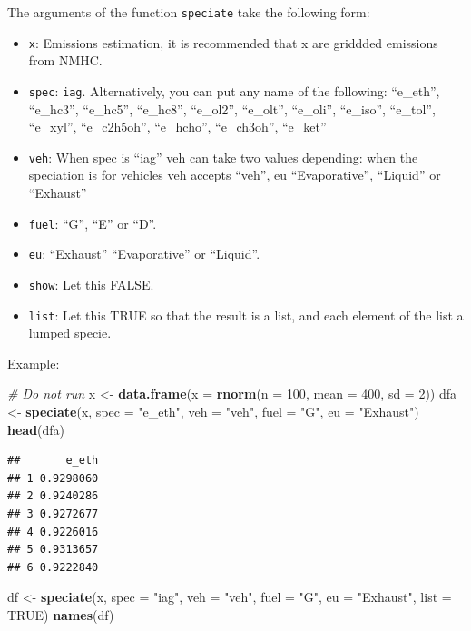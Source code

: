 \documentclass[12pt,graybox,envcountchap,sectrefs]{krantz}
\makeatletter
\newenvironment{Shaded}{\begin{snugshade}}{\end{snugshade}}
\newcommand{\KeywordTok}[1]{\textcolor[rgb]{0.13,0.29,0.53}{\textbf{#1}}}
\newcommand{\DataTypeTok}[1]{\textcolor[rgb]{0.13,0.29,0.53}{#1}}
\newcommand{\DecValTok}[1]{\textcolor[rgb]{0.00,0.00,0.81}{#1}}
\newcommand{\StringTok}[1]{\textcolor[rgb]{0.31,0.60,0.02}{#1}}
\newcommand{\CommentTok}[1]{\textcolor[rgb]{0.56,0.35,0.01}{\textit{#1}}}
\newcommand{\OtherTok}[1]{\textcolor[rgb]{0.56,0.35,0.01}{#1}}
\newcommand{\NormalTok}[1]{#1}
\providecommand{\tightlist}{%
  \setlength{\itemsep}{0pt}\setlength{\parskip}{0pt}}
\newenvironment{kframe}{%
\medskip{}
\setlength{\fboxsep}{.8em}
 \def\at@end@of@kframe{}%
 \ifinner\ifhmode%
  \def\at@end@of@kframe{\end{minipage}}%
  \begin{minipage}{\columnwidth}%
 \fi\fi%
 \def\FrameCommand##1{\hskip\@totalleftmargin \hskip-\fboxsep
 \colorbox{shadecolor}{##1}\hskip-\fboxsep
     \hskip-\linewidth \hskip-\@totalleftmargin \hskip\columnwidth}%
 \MakeFramed {\advance\hsize-\width
   \@totalleftmargin\z@ \linewidth\hsize
   \@setminipage}}%
 {\par\unskip\endMakeFramed%
 \at@end@of@kframe}
\renewenvironment{Shaded}{\begin{kframe}}{\end{kframe}}
\theoremstyle{definition}
\theoremstyle{definition}
\theoremstyle{definition}
\theoremstyle{remark}
\makeatother
\begin{document}
The arguments of the function \texttt{speciate} take the following form:

\begin{itemize}
\tightlist
\item
  \texttt{x}: Emissions estimation, it is recommended that x are
  griddded emissions from NMHC.
\item
  \texttt{spec}: \texttt{iag}. Alternatively, you can put any name of
  the following: ``e\_eth'', ``e\_hc3'', ``e\_hc5'', ``e\_hc8'',
  ``e\_ol2'', ``e\_olt'', ``e\_oli'', ``e\_iso'', ``e\_tol'',
  ``e\_xyl'', ``e\_c2h5oh'', ``e\_hcho'', ``e\_ch3oh'', ``e\_ket''
\item
  \texttt{veh}: When spec is ``iag'' veh can take two values depending:
  when the speciation is for vehicles veh accepts ``veh'', eu
  ``Evaporative'', ``Liquid'' or ``Exhaust''
\item
  \texttt{fuel}: ``G'', ``E'' or ``D''.
\item
  \texttt{eu}: ``Exhaust'' ``Evaporative'' or ``Liquid''.
\item
  \texttt{show}: Let this FALSE.
\item
  \texttt{list}: Let this TRUE so that the result is a list, and each
  element of the list a lumped specie.
\end{itemize}

Example:

\begin{Shaded}
\begin{Highlighting}[]
\CommentTok{# Do not run}
\NormalTok{x <-}\StringTok{ }\KeywordTok{data.frame}\NormalTok{(}\DataTypeTok{x =} \KeywordTok{rnorm}\NormalTok{(}\DataTypeTok{n =} \DecValTok{100}\NormalTok{, }\DataTypeTok{mean =} \DecValTok{400}\NormalTok{, }\DataTypeTok{sd =} \DecValTok{2}\NormalTok{))}
\NormalTok{dfa <-}\StringTok{ }\KeywordTok{speciate}\NormalTok{(x, }\DataTypeTok{spec =} \StringTok{"e_eth"}\NormalTok{, }\DataTypeTok{veh =} \StringTok{"veh"}\NormalTok{, }\DataTypeTok{fuel =} \StringTok{"G"}\NormalTok{, }\DataTypeTok{eu =} \StringTok{"Exhaust"}\NormalTok{)}
\KeywordTok{head}\NormalTok{(dfa)}
\end{Highlighting}
\end{Shaded}

\begin{verbatim}
##       e_eth
## 1 0.9298060
## 2 0.9240286
## 3 0.9272677
## 4 0.9226016
## 5 0.9313657
## 6 0.9222840
\end{verbatim}

\begin{Shaded}
\begin{Highlighting}[]
\NormalTok{df <-}\StringTok{ }\KeywordTok{speciate}\NormalTok{(x, }\DataTypeTok{spec =} \StringTok{"iag"}\NormalTok{, }\DataTypeTok{veh =} \StringTok{"veh"}\NormalTok{, }\DataTypeTok{fuel =} \StringTok{"G"}\NormalTok{,}
               \DataTypeTok{eu =} \StringTok{"Exhaust"}\NormalTok{, }\DataTypeTok{list =} \OtherTok{TRUE}\NormalTok{)}
\KeywordTok{names}\NormalTok{(df)}
\end{Highlighting}
\end{Shaded}
\end{document}
